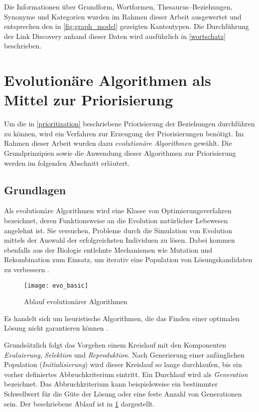 Die Informationen über Grundform, Wortformen, Thesaurus--Beziehungen, Synonyme und Kategorien wurden im Rahmen dieser Arbeit ausgewertet und entsprechen den in \cref{fig:graph_model} gezeigten Kantentypen. Die Durchführung der Link Discovery anhand dieser Daten wird ausführlich in \cref{wortschatz} beschrieben.

\section{Evolutionäre Algorithmen als Mittel zur Priorisierung}
\label{evo_for_prio}

Um die in \cref{prioritization} beschriebene Priorisierung der Beziehungen durchführen zu können, wird ein Verfahren zur Erzeugung der Priorisierungen benötigt. Im Rahmen dieser Arbeit wurden dazu \emph{evolutionäre Algorithmen} gewählt. Die Grundprinzipien sowie die Anwendung dieser Algorithmen zur Priorisierung werden im folgenden Abschnitt erläutert.

\subsection{Grundlagen}
\label{evo}

Als evolutionäre Algorithmen wird eine Klasse von Optimierungsverfahren bezeichnet, deren Funktionsweise an die Evolution natürlicher Lebewesen angelehnt ist. Sie versuchen, Probleme durch die Simulation von Evolution mittels der Auswahl der erfolgreichsten Individuen zu lösen. Dabei kommen ebenfalls aus der Biologie entlehnte Mechanismen wie Mutation und Rekombination zum Einsatz, um iterativ eine Population von Lösungskandidaten zu verbessern \cite{tw2008}.

\begin{figure}
\centering
\texttt{[image: evo\_basic]}
\caption{Ablauf evolutionärer Algorithmen}
\label{fig:evo_basic}
\end{figure}

Es handelt sich um heuristische Algorithmen, die das Finden einer optimalen Lösung nicht garantieren können \cite[S. 12]{gk2004}.

Grundsätzlich folgt das Vorgehen einem Kreislauf mit den Komponenten \emph{Evaluierung}, \emph{Selektion} und \emph{Reproduktion}. Nach Generierung einer anfänglichen Population (\emph{Initialisierung}) wird dieser Kreislauf so lange durchlaufen, bis ein vorher definiertes Abbruchkriterium eintritt. Ein Durchlauf wird als \emph{Generation} bezeichnet. Das Abbruchkriterium kann beispielsweise ein bestimmter Schwellwert für die Güte der Lösung oder eine feste Anzahl von Generationen sein. Der beschriebene Ablauf ist in \cref{fig:evo_basic} dargestellt.

